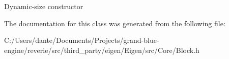 Dynamic-\/size constructor 

The documentation for this class was generated from the following file\+:\begin{DoxyCompactItemize}
\item 
C\+:/\+Users/dante/\+Documents/\+Projects/grand-\/blue-\/engine/reverie/src/third\+\_\+party/eigen/\+Eigen/src/\+Core/Block.\+h\end{DoxyCompactItemize}
